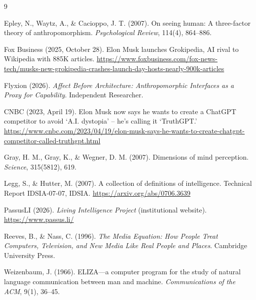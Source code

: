 \documentclass[11pt]{article}
\begin{document}
\begin{thebibliography}{9}

 Epley, N., Waytz, A., \& Cacioppo, J. T. (2007). On seeing human: A three-factor theory of anthropomorphism. \textit{Psychological Review}, 114(4), 864--886.

 Fox Business (2025, October 28). Elon Musk launches Grokipedia, AI rival to Wikipedia with 885K articles. \url{https://www.foxbusiness.com/fox-news-tech/musks-new-grokipedia-crashes-launch-day-hosts-nearly-900k-articles}

 Flyxion (2026). \textit{Affect Before Architecture: Anthropomorphic Interfaces as a Proxy for Capability}. Independent Researcher.

 CNBC (2023, April 19). Elon Musk now says he wants to create a ChatGPT competitor to avoid `A.I. dystopia' -- he's calling it `TruthGPT.' \url{https://www.cnbc.com/2023/04/19/elon-musk-says-he-wants-to-create-chatgpt-competitor-called-truthgpt.html}

 Gray, H. M., Gray, K., \& Wegner, D. M. (2007). Dimensions of mind perception. \textit{Science}, 315(5812), 619.

 Legg, S., \& Hutter, M. (2007). A collection of definitions of intelligence. Technical Report IDSIA-07-07, IDSIA. \url{https://arxiv.org/abs/0706.3639}

 PassusLI (2026). \textit{Living Intelligence Project} (institutional website). \url{https://www.passus.li/}

 Reeves, B., \& Nass, C. (1996). \textit{The Media Equation: How People Treat Computers, Television, and New Media Like Real People and Places}. Cambridge University Press.

 Weizenbaum, J. (1966). ELIZA---a computer program for the study of natural language communication between man and machine. \textit{Communications of the ACM}, 9(1), 36--45.

\end{thebibliography}
\end{document}
